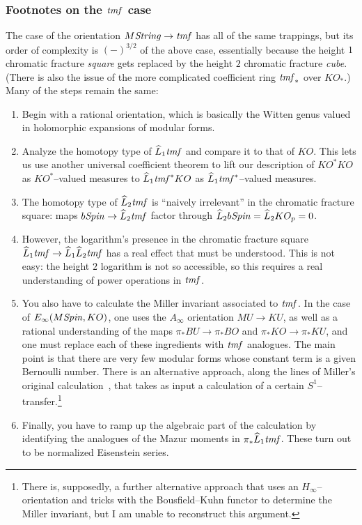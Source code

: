\subsubsection{Footnotes on the $\mathit{tmf}$ case}

The case of the orientation $M\mathit{String} \to \mathit{tmf}$ has all of the same trappings, but its order of complexity is $(-)^{3/2}$ of the above case, essentially because the height $1$ chromatic fracture \emph{square} gets replaced by the height $2$ chromatic fracture \emph{cube}.  (There is also the issue of the more complicated coefficient ring $\mathit{tmf}_*$ over $KO_*$.)  Many of the steps remain the same:
\begin{enumerate}
    \item Begin with a rational orientation, which is basically the Witten genus valued in holomorphic expansions of modular forms.
    \item Analyze the homotopy type of $\widehat L_1 \mathit{tmf}$ and compare it to that of $KO$.  This lets us use another universal coefficient theorem to lift our description of $KO^* KO$ as $KO^*$--valued measures to $\widehat L_1 \mathit{tmf}^* KO$ as $\widehat L_1 \mathit{tmf}^*$--valued measures.
    \item The homotopy type of $\widehat L_2 \mathit{tmf}$ is ``naively irrelevant'' in the chromatic fracture square: maps $b\mathit{Spin} \to \widehat L_2 \mathit{tmf}$ factor through $\widehat L_2 b\mathit{Spin} = \widehat L_2 KO_p = 0$.
    \item However, the logarithm's presence in the chromatic fracture square $\widehat L_1 \mathit{tmf} \to \widehat L_1 \widehat L_2 \mathit{tmf}$ has a real effect that must be understood.  This is not easy: the height $2$ logarithm is not so accessible, so this requires a real understanding of power operations in $\mathit{tmf}$.
    \item You also have to calculate the Miller invariant associated to $\mathit{tmf}$.  In the case of $E_\infty(M\mathit{Spin}, KO)$, one uses the $A_\infty$ orientation $MU \to KU$, as well as a rational understanding of the maps $\pi_* BU \to \pi_* BO$ and $\pi_* KO \to \pi_* KU$, and one must replace each of these ingredients with $\mathit{tmf}$ analogues.  The main point is that there are very few modular forms whose constant term is a given Bernoulli number.  There is an alternative approach, along the lines of Miller's original calculation~\cite{MillerBernoulliNos}, that takes as input a calculation of a certain $S^1$--transfer.\footnote{There is, supposedly, a further alternative approach that uses an $H_\infty$--orientation and tricks with the Bousfield--Kuhn functor to determine the Miller invariant, but I am unable to reconstruct this argument.}
    \item Finally, you have to ramp up the algebraic part of the calculation by identifying the analogues of the Mazur moments in $\pi_* \widehat L_1 \mathit{tmf}$.  These turn out to be normalized Eisenstein series.
\end{enumerate}

